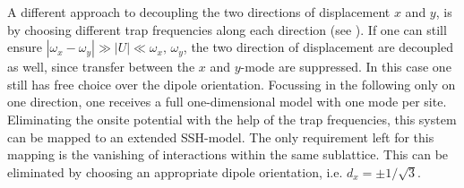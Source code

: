 A different approach to decoupling the two directions of displacement $x$ and $y$, is by choosing different trap frequencies along each direction (see ). If one can still ensure $|\omega_x-\omega_y|\gg|U|\ll\omega_x,\,\omega_y$, the two direction of displacement are decoupled as well, since transfer between the $x$ and $y$-mode are suppressed. In this case one still has free choice over the dipole orientation. Focussing in the following only on one direction, one receives a full one-dimensional model with one mode per site. Eliminating the onsite potential with the help of the trap frequencies, this system can be mapped to an extended SSH-model. The only requirement left for this mapping is the vanishing of interactions within the same sublattice. This can be eliminated by choosing an appropriate dipole orientation, i.e. $d_x=\pm1/\sqrt{3}$.



